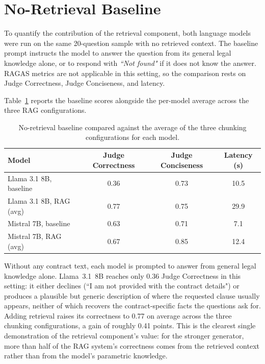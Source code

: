 \section{No-Retrieval Baseline}

To quantify the contribution of the retrieval component, both language models were run on the same 20-question sample with no retrieved context. The baseline prompt instructs the model to answer the question from its general legal knowledge alone, or to respond with \textit{``Not found"} if it does not know the answer. RAGAS metrics are not applicable in this setting, so the comparison rests on Judge Correctness, Judge Conciseness, and latency.

Table~\ref{tab:baseline} reports the baseline scores alongside the per-model average across the three RAG configurations.

\begin{table}[ht]
\centering
\begin{tabular}{lccc}
\toprule
\textbf{Model} & \textbf{Judge Correctness} & \textbf{Judge Conciseness} & \textbf{Latency (s)} \\
\midrule
Llama 3.1 8B, baseline   & 0.36 & 0.73 & 10.5 \\
Llama 3.1 8B, RAG (avg)  & 0.77 & 0.75 & 29.9 \\
\midrule
Mistral 7B, baseline     & 0.63 & 0.71 & 7.1  \\
Mistral 7B, RAG (avg)    & 0.67 & 0.85 & 12.4 \\
\bottomrule
\end{tabular}
\caption{No-retrieval baseline compared against the average of the three chunking configurations for each model.}
\label{tab:baseline}
\end{table}

Without any contract text, each model is prompted to answer from general legal knowledge alone. Llama~3.1~8B reaches only 0.36 Judge Correctness in this setting: it either declines (``I am not provided with the contract details") or produces a plausible but generic description of where the requested clause usually appears, neither of which recovers the contract-specific facts the questions ask for. Adding retrieval raises its correctness to 0.77 on average across the three chunking configurations, a gain of roughly 0.41 points. This is the clearest single demonstration of the retrieval component's value: for the stronger generator, more than half of the RAG system's correctness comes from the retrieved context rather than from the model's parametric knowledge.

